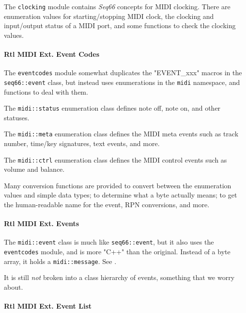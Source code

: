    The \texttt{clocking} module contains \textsl{Seq66} concepts for
   MIDI clocking. There are enumeration values for starting/stopping MIDI
   clock, the clocking and input/output status of a MIDI port, and some
   functions to check the clocking values.

\paragraph{Rtl MIDI Ext. Event Codes}
\label{paragraph:rtl_midi_extensions_event_codes}

   The \texttt{eventcodes} module somewhat duplicates the "EVENT\_xxx"
   macros in the \texttt{seq66::event} class, but instead uses enumerations in
   the \texttt{midi} namespace, and functions to deal with them.

   The \texttt{midi::status} enumeration class defines note off, note on,
   and other statuses.

   The \texttt{midi::meta} enumeration class defines the MIDI meta events such
   as track number, time/key signatures, text events, and more.

   The \texttt{midi::ctrl} enumeration class defines the MIDI control
   events such as volume and balance.

   Many conversion functions are provided to convert between the enumeration
   values and simple data types; to determine what a byte actually means;
   to get the human-readable name for the event, RPN conversions, and more.

\paragraph{Rtl MIDI Ext. Events}
\label{paragraph:rtl_midi_extensions_events}

   The \texttt{midi::event} class is much like \texttt{seq66::event},
   but it also uses the \texttt{eventcodes} module, and is more
   "C++" than the original.
   Instead of a byte array, it holds a \texttt{midi::message}.
   See .

   It is still \textsl{not} broken into a class hierarchy of events,
   something that we worry about.

\paragraph{Rtl MIDI Ext. Event List}
\label{paragraph:rtl_midi_extensions_eventlist}

